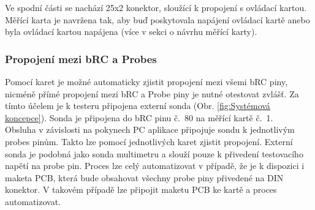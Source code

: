     Ve spodní části se nachází 25x2 konektor, sloužící k propojení s ovládací kartou. Měřící karta je navržena tak, aby buď poskytovala
    napájení ovládací kartě anebo byla ovládací kartou napájena (více v sekci o návrhu měřící karty).

    \subsubsection{Propojení mezi bRC a Probes}
    Pomocí karet je možné automaticky zjistit propojení mezi všemi bRC piny,
    nicméně přímé propojení mezi bRC a Probe piny je nutné otestovat zvlášť.
    Za tímto účelem je k testeru připojena externí sonda (Obr. \ref{fig:Systémová koncepce}).
    Sonda je připojena do bRC pinu \hbox{č. 80} na měřící
    kartě \hbox{č. 1.}\\

    Obsluha v závislosti na pokynech PC aplikace připojuje sondu k jednotlivým probes pinům.
    Takto lze pomocí jednotlivých karet zjistit propojení.
    Externí sonda je podobná jako sonda multimetru a slouží pouze k přivedení testovacího napětí na probe pin.
    Proces lze celý automatizovat v případě, že je k dispozici i maketa PCB,
    která bude obsahovat všechny probe piny přivedené na DIN konektor.
    V takovém případě lze připojit maketu PCB ke kartě a proces automatizovat.